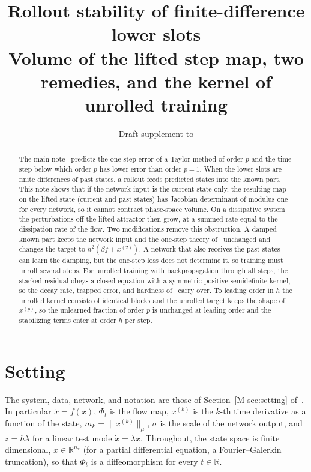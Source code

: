 \documentclass[11pt]{article}
\title{Rollout stability of finite-difference lower slots\\[4pt]
\large Volume of the lifted step map, two remedies, and the kernel of unrolled training}
\author{Draft supplement to \cite{main}}
\date{}
\newcommand{\Mref}[1]{\ref{M-#1} of~\cite{main}}
\theoremstyle{definition}
\theoremstyle{remark}
\newcommand{\R}{\mathbb{R}}
\begin{document}
\maketitle

\begin{abstract}
The main note~\cite{main} predicts the one-step error of a Taylor method of order $p$ and the time step below which order $p$ has lower error than order $p-1$.
When the lower slots are finite differences of past states, a rollout feeds predicted states into the known part.
This note shows that if the network input is the current state only, the resulting map on the lifted state (current and past states) has Jacobian determinant of modulus one for every network, so it cannot contract phase-space volume.
On a dissipative system the perturbations off the lifted attractor then grow, at a summed rate equal to the dissipation rate of the flow.
Two modifications remove this obstruction.
A damped known part keeps the network input and the one-step theory of~\cite{main} unchanged and changes the target to $h^2(\beta f + x^{(2)})$.
A network that also receives the past states can learn the damping, but the one-step loss does not determine it, so training must unroll several steps.
For unrolled training with backpropagation through all steps, the stacked residual obeys a closed equation with a symmetric positive semidefinite kernel, so the decay rate, trapped error, and hardness of~\cite{main} carry over.
To leading order in $h$ the unrolled kernel consists of identical blocks and the unrolled target keeps the shape of $x^{(p)}$, so the unlearned fraction of order $p$ is unchanged at leading order and the stabilizing terms enter at order $h$ per step.
\end{abstract}

\section{Setting}\label{sec:setting}

The system, data, network, and notation are those of Section~\Mref{sec:setting}.
In particular $\dot x = f(x)$, $\Phi_t$ is the flow map, $x^{(k)}$ is the $k$-th time derivative as a function of the state, $m_k = \|x^{(k)}\|_\mu$, $\sigma$ is the scale of the network output, and $z = h\lambda$ for a linear test mode $\dot x = \lambda x$.
Throughout, the state space is finite dimensional, $x \in \R^{n_{\mathrm x}}$ (for a partial differential equation, a Fourier--Galerkin truncation), so that $\Phi_t$ is a diffeomorphism for every $t \in \R$.
\end{document}
